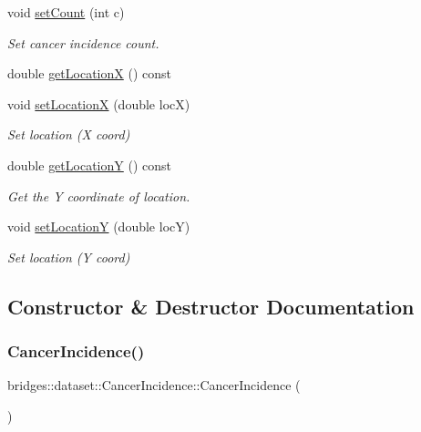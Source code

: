 \begin{DoxyCompactItemize}
void \mbox{\hyperlink{classbridges_1_1dataset_1_1_cancer_incidence_ac7083b46243f611392d33fc1c2dbce0d}{set\+Count}} (int c)
\begin{DoxyCompactList}\small\item\em Set cancer incidence count. \end{DoxyCompactList}\item 
double \mbox{\hyperlink{classbridges_1_1dataset_1_1_cancer_incidence_a982dc26b86ddeddf57d284b78dfd0752}{get\+LocationX}} () const
\item 
void \mbox{\hyperlink{classbridges_1_1dataset_1_1_cancer_incidence_af373c05a20c7a230f62be3ed53889787}{set\+LocationX}} (double locX)
\begin{DoxyCompactList}\small\item\em Set location (X coord) \end{DoxyCompactList}\item 
double \mbox{\hyperlink{classbridges_1_1dataset_1_1_cancer_incidence_af962caa4876c628cae5beaca9780650e}{get\+LocationY}} () const
\begin{DoxyCompactList}\small\item\em Get the Y coordinate of location. \end{DoxyCompactList}\item 
void \mbox{\hyperlink{classbridges_1_1dataset_1_1_cancer_incidence_ab18e0703f97909a0a37c5e9a3460736a}{set\+LocationY}} (double locY)
\begin{DoxyCompactList}\small\item\em Set location (Y coord) \end{DoxyCompactList}\end{DoxyCompactItemize}


\subsection{Constructor \& Destructor Documentation}
\mbox{\label{classbridges_1_1dataset_1_1_cancer_incidence_a2a6314af5704aa8f9f962738e12cd9dc}} 
\subsubsection{\texorpdfstring{CancerIncidence()}{CancerIncidence()}}
{\footnotesize\ttfamily bridges\+::dataset\+::\+Cancer\+Incidence\+::\+Cancer\+Incidence (\begin{DoxyParamCaption}{ }\end{DoxyParamCaption})\hspace{0.3cm}{\ttfamily [inline]}}



